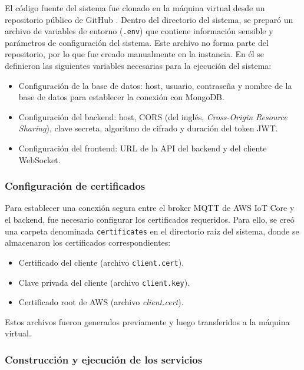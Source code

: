 El código fuente del sistema fue clonado en la máquina virtual desde un
repositorio público de GitHub \cite{EnviroSenseIoT}. Dentro del directorio del
sistema, se preparó un archivo de variables de entorno (\texttt{.env}) que
contiene información sensible y parámetros de configuración del sistema. Este
archivo no forma parte del repositorio, por lo que fue creado manualmente en la
instancia. En él se definieron las siguientes variables necesarias para la
ejecución del sistema:

\begin{itemize}
    \item Configuración de la base de datos: host, usuario, contraseña y nombre de la
          base de datos para establecer la conexión con MongoDB.
    \item Configuración del backend: host, CORS (del inglés, \textit{Cross-Origin
              Resource Sharing}), clave secreta, algoritmo de cifrado y duración del token
          JWT.
    \item Configuración del frontend: URL de la API del backend y del cliente WebSocket.
\end{itemize}

\subsubsection{Configuración de certificados}

Para establecer una conexión segura entre el broker MQTT de AWS IoT Core y el
backend, fue necesario configurar los certificados requeridos. Para ello, se
creó una carpeta denominada \texttt{certificates} en el directorio raíz del
sistema, donde se almacenaron los certificados correspondientes:

\begin{itemize}
    \item Certificado del cliente (archivo \texttt{client.cert}).
    \item Clave privada del cliente (archivo \texttt{client.key}).
    \item Certificado root de AWS (archivo \textit{client.cert}).
\end{itemize}

Estos archivos fueron generados previamente y luego transferidos a la máquina
virtual.

\subsubsection{Construcción y ejecución de los servicios}

